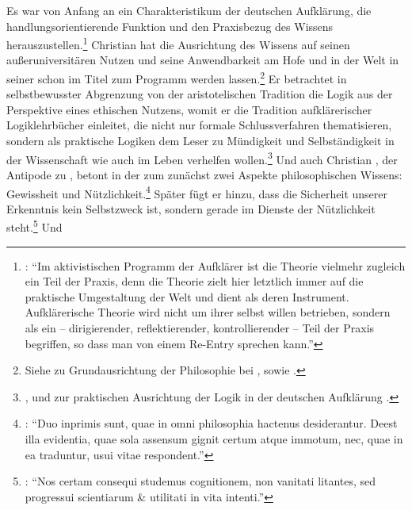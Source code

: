 Es war von Anfang an ein Charakteristikum der deutschen
Aufklärung, die handlungsorientierende Funktion und den Praxisbezug des Wissens
herauszustellen.\footnote{\cite[Vgl.][xviii]{Berndt:PraxisundProgramm2012}:
\enquote{Im aktivistischen Programm der Aufklärer ist die Theorie vielmehr
zugleich ein Teil der Praxis, denn die Theorie zielt hier letztlich immer auf
die praktische Umgestaltung der Welt und dient als deren Instrument.
Aufklärerische Theorie wird nicht um ihrer selbst willen betrieben, sondern als
ein – dirigierender, reflektierender, kontrollierender – Teil der Praxis
begriffen, so dass man von einem Re-Entry sprechen kann.}}
Christian  hat die Ausrichtung des Wissens auf seinen
außeruniversitären Nutzen und seine Anwendbarkeit am Hofe und in der Welt in
seiner  schon im Titel zum Programm
werden lassen.\footnote{Siehe zu Grundausrichtung der Philosophie bei
\cite[][]{Schneiders:300JahreAufklaerunginDeutschland1989},
sowie
\cite{Ciafardone:UeberdasPrimatderpraktischenVernunftvordertheoretischenbeiThomasiusundCrusiusmitBeziehungaufKant1982}.}
Er betrachtet in selbstbewusster Abgrenzung von der aristotelischen Tradition
die Logik aus der Perspektive eines ethischen Nutzens, womit er die Tradition
aufklärerischer Logiklehrbücher einleitet, die nicht nur formale
Schlussverfahren thematisieren, sondern als praktische Logiken dem Leser zu
Mündigkeit und Selbständigkeit in der Wissenschaft wie auch im Leben verhelfen
wollen.\footnote{\label{Fussnote:PraktischeLogiken}\cite[Vgl.][248]{Albrecht:ChristianThomasius1999},
und zur praktischen Ausrichtung der Logik in der deutschen Aufklärung
\cite{Schneiders:PraktischeLogik1980}.} Und auch Christian , der
Antipode zu , betont in der  zum
 zunächst zwei Aspekte philosophischen
Wissens: Gewissheit und
Nützlichkeit.\footnote{\cite[Vgl.][262]{Wolff:Discursuspraeliminarisdephilosophiaingenere1996}:
\enquote{Duo inprimis sunt, quae in omni philosophia hactenus desiderantur.
Deest illa evidentia, quae sola assensum gignit certum atque immotum, nec, quae
in ea traduntur, usui vitae respondent.}} Später fügt er hinzu, dass die
Sicherheit unserer Erkenntnis kein Selbstzweck ist, sondern gerade im Dienste
der Nützlichkeit
steht.\footnote{\cite[Vgl.][\S~139]{Wolff:Discursuspraeliminarisdephilosophiaingenere1996}:
\enquote{Nos certam consequi studemus cognitionem, non vanitati litantes, sed
progressui scientiarum {\&} utilitati in vita intenti.}}  Und

